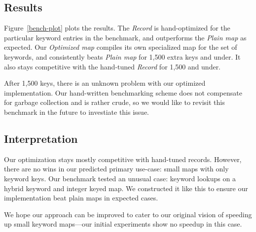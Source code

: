 \documentclass[preprint]{sigplanconf}
\begin{document}
\subsection{Results}

Figure~\ref{bench-plot} plots the results.
The \emph{Record} is hand-optimized for the particular
keyword entries in the benchmark, and outperforms
the \emph{Plain map} as expected.
Our \emph{Optimized map} compiles its own specialized
map for the set of keywords, and consistently
beats \emph{Plain map} for 1,500 extra keys and under.
It also stays competitive with the hand-tuned \emph{Record}
for 1,500 and under.

After 1,500 keys, there is an unknown problem with our optimized
implementation. Our hand-written benchmarking scheme
does not compensate for garbage collection and is rather crude,
so we would like to revisit this benchmark in the future to 
investiate this issue.

\subsection{Interpretation}

Our optimization stays mostly competitive with hand-tuned
records. However, there are no wins in our predicted
primary use-case: small maps with only keyword keys.
Our benchmark tested an unusual case: keyword lookups on a
hybrid keyword and integer keyed map.
We constructed it like this to ensure our implementation beat
plain maps in expected cases.

We hope our approach can be improved to cater to our
original vision of speeding up small keyword maps---our
initial experiments show no speedup in this case.

\end{document}
